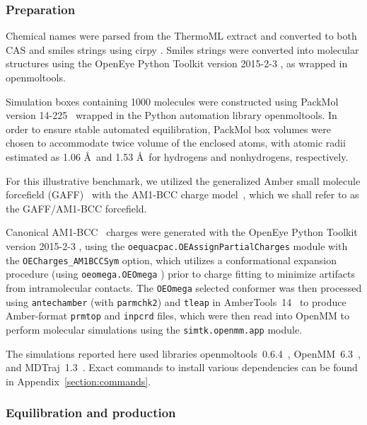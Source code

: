 \documentclass[aip, jcp, reprint]{revtex4-1}  %
\begin{document}
\subsubsection{Preparation}
\label{section:preparation}

Chemical names were parsed from the ThermoML extract and converted to both CAS and smiles strings using cirpy \cite{swain2012cirpy}.  Smiles strings were converted into molecular structures using the OpenEye Python Toolkit version 2015-2-3 \cite{openeye}, as wrapped in openmoltools.  

Simulation boxes containing 1000 molecules were constructed using PackMol version 14-225~\cite{martinez2009packmol, packmolurl} wrapped in the Python automation library openmoltools.
In order to ensure stable automated equilibration, PackMol box volumes were chosen to accommodate twice volume of the enclosed atoms, with atomic radii estimated as 1.06 \AA\ and 1.53 \AA\ for hydrogens and nonhydrogens, respectively.  

For this illustrative benchmark, we utilized the generalized Amber small molecule forcefield (GAFF)~\cite{gaff,gaff2} with the AM1-BCC charge model~\cite{am1bcc1,am1bcc2}, which we shall refer to as the GAFF/AM1-BCC forcefield.

Canonical AM1-BCC~\cite{am1bcc1,am1bcc2, velez2014time} charges were generated with the OpenEye Python Toolkit version 2015-2-3 \cite{openeye}, using the {\tt oequacpac.OEAssignPartialCharges} module with the {\tt OECharges\_AM1BCCSym} option, which utilizes a conformational expansion procedure (using {\tt oeomega.OEOmega} \cite{hawkins2012conformer}) prior to charge fitting to minimize artifacts from intramolecular contacts.  
The {\tt OEOmega} selected conformer was then processed using {\tt antechamber} (with {\tt parmchk2}) and {\tt tleap} in AmberTools~14~\cite{amber14} to produce Amber-format {\tt prmtop} and {\tt inpcrd} files, which were then read into OpenMM to perform molecular simulations using the {\tt simtk.openmm.app} module.

The simulations reported here used libraries openmoltools~0.6.4~\cite{openmoltools}, OpenMM~6.3~\cite{eastman2012openmm}, and MDTraj~1.3~\cite{mcgibbon2014mdtraj}.  
Exact commands to install various dependencies can be found in Appendix~\ref{section:commands}.

\subsubsection{Equilibration and production}
\label{section:production}
\end{document}

